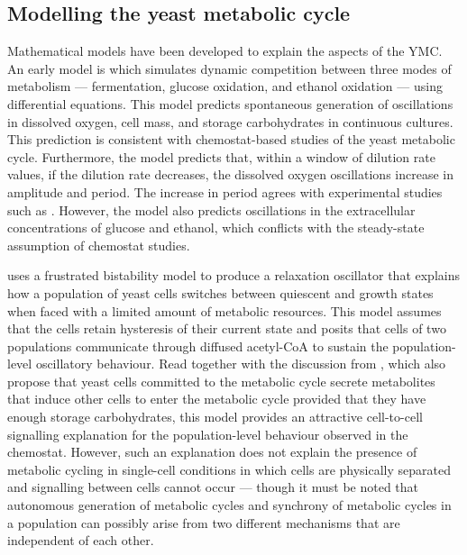 \subsection{Modelling the yeast metabolic cycle}
\label{subsec:intro-ymc-model}


Mathematical models have been developed to explain the aspects of the YMC.
An early model is \parencite{jonesCyberneticModelGrowth1999} which simulates dynamic competition between three modes of metabolism --- fermentation, glucose oxidation, and ethanol oxidation --- using differential equations.
This model predicts spontaneous generation of oscillations in dissolved oxygen, cell mass, and storage carbohydrates in continuous cultures.
This prediction is consistent with chemostat-based studies of the yeast metabolic cycle.
Furthermore, the model predicts that, within a window of dilution rate values, if the dilution rate decreases, the dissolved oxygen oscillations increase in amplitude and period.
The increase in period agrees with experimental studies such as \textcite{oneillEukaryoticCellBiology2020}.
However, the model also predicts oscillations in the extracellular concentrations of glucose and ethanol, which conflicts with the steady-state assumption of chemostat studies.

\textcite{krishnaMinimalPushPull2018} uses a frustrated bistability model to produce a relaxation oscillator that explains how a population of yeast cells switches between quiescent and growth states when faced with a limited amount of metabolic resources.
This model assumes that the cells retain hysteresis of their current state and posits that cells of two populations communicate through diffused acetyl-CoA to sustain the population-level oscillatory behaviour.
Read together with the discussion from \textcite{burnettiCellCycleStart2016}, which also propose that yeast cells committed to the metabolic cycle secrete metabolites that induce other cells to enter the metabolic cycle provided that they have enough storage carbohydrates, this model provides an attractive cell-to-cell signalling explanation for the population-level behaviour observed in the chemostat.
However, such an explanation does not explain the presence of metabolic cycling in single-cell conditions in which cells are physically separated and signalling between cells cannot occur --- though it must be noted that autonomous generation of metabolic cycles and synchrony of metabolic cycles in a population can possibly arise from two different mechanisms that are independent of each other.

